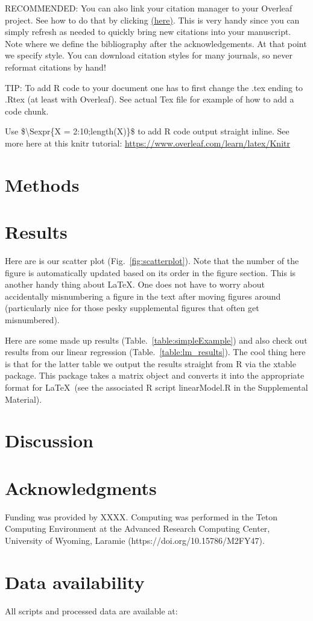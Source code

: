 \documentclass[letterpaper, 12pt]{article}
\begin{document}
\begin{linenumbers}
RECOMMENDED: You can also link your citation manager to your Overleaf project. See how to do that by clicking \href{https://www.overleaf.com/learn/latex/Bibliography_management_with_bibtex}{(here)}. This is very handy since you can simply refresh as needed to quickly bring new citations into your manuscript. Note where we define the bibliography after the acknowledgements. At that point we specify style. You can download citation styles for many journals, so never reformat citations by hand!

TIP:  
To add R code to your document one has to first change the .tex ending to .Rtex (at least with Overleaf). See actual Tex file for example of how to add a code chunk.

Use \$\textbackslash Sexpr\{X = 2:10;length(X)\}\$ to add R code output straight inline. See more here at this knitr tutorial: \url{https://www.overleaf.com/learn/latex/Knitr}

\section*{Methods}

\section*{Results}
Here are is our scatter plot (Fig.~\ref{fig:scatterplot}). Note that the number of the figure is automatically updated based on its order in the figure section. This is another handy thing about \LaTeX. One does not have to worry about accidentally misnumbering a figure in the text after moving figures around (particularly nice for those pesky supplemental figures that often get misnumbered).

Here are some made up results (Table.~\ref{table:simpleExample}) and also check out results from our linear regression (Table.~\ref{table:lm_results}). The cool thing here is that for the latter table we output the results straight from R via the xtable package. This package takes a matrix object and converts it into the appropriate format for \LaTeX\ (see the associated R script linearModel.R in the Supplemental Material).

\section*{Discussion}

\section*{Acknowledgments}
Funding was provided by XXXX. Computing was performed in the Teton Computing Environment at the Advanced Research Computing Center, University of Wyoming, Laramie (https://doi.org/10.15786/M2FY47).

\section*{Data availability}
All scripts and processed data are available at:

\end{linenumbers}
\end{document}
